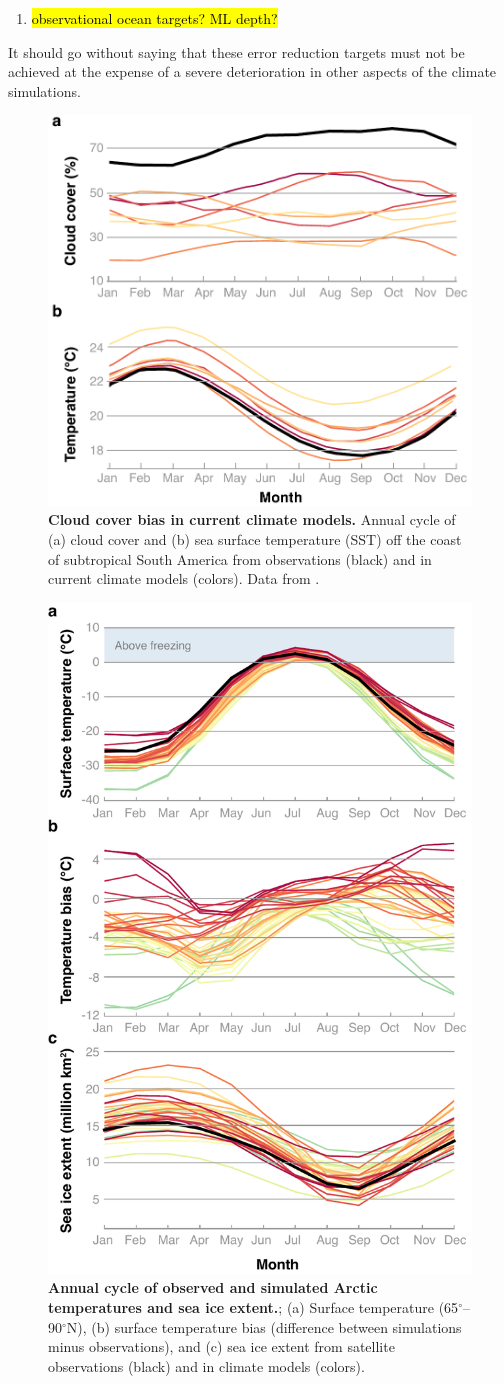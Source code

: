 \documentclass{article}
\begin{document}
\begin{enumerate}
\begin{enumerate}
        \item \hl{observational ocean targets? ML depth?}
    \end{enumerate}
      It should go without saying that these error reduction targets must not be achieved at the expense of a severe deterioration in other aspects of the climate simulations. 
         \begin{figure}[htb]
     \centerline{\includegraphics[width=.6\textwidth]{Lin-Sc-bias.pdf}}
      \caption{\textbf{Cloud cover bias in current climate models.} Annual cycle of (a) cloud cover and (b) sea surface temperature (SST) off the coast of subtropical South America from observations (black) and in current climate models (colors). Data from \protect\citet{Lin14b}.}\label{f:Sc-bias}
    \end{figure}
        \begin{figure}[htb]
      \centerline{\includegraphics[width=.6\textwidth]{CMIP5-Arctic}}
       \caption{\textbf{Annual cycle of observed and simulated Arctic temperatures and sea ice extent.}; (a) Surface temperature (65$^\circ$--90$^\circ$N), (b) surface temperature bias (difference between simulations minus observations), and (c) sea ice extent from satellite observations (black) and in climate models (colors).}\label{f:polar-bias}
    \end{figure}


\end{enumerate}
\end{document}
